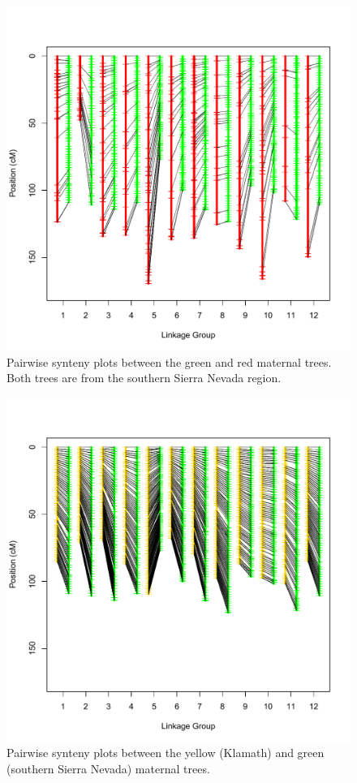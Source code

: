 \documentclass[smallextended]{svjour3}
\begin{document}
\begin{figure}[ht]
  \centering
  \includegraphics[width=\textwidth]{green_red_synteny}
  \caption{Pairwise synteny plots between the green and red maternal trees. Both trees are from the southern Sierra Nevada region.}
  \label{f:con}
\end{figure}

\begin{figure}[ht]
  \centering
  \includegraphics[width=\textwidth]{yellow_green_synteny}
  \caption{Pairwise synteny plots between the yellow (Klamath) and green (southern Sierra Nevada) maternal trees.}
  \label{f:con}
\end{figure}
\end{document}
